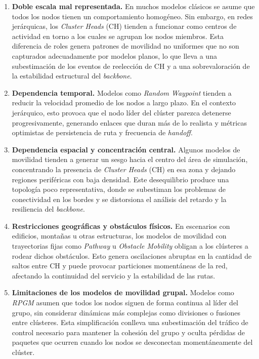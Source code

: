 \documentclass{article}
\begin{document}
\begin{enumerate}
    \item \textbf{Doble escala mal representada.} 
    En muchos modelos clásicos se asume que todos los nodos tienen un comportamiento homogéneo. Sin embargo, en redes jerárquicas, los \textit{Cluster Heads} (CH) tienden a funcionar como centros de actividad en torno a los cuales se agrupan los nodos miembros. Esta diferencia de roles genera patrones de movilidad no uniformes que no son capturados adecuadamente por modelos planos, lo que lleva a una subestimación de los eventos de reelección de CH y a una sobrevaloración de la estabilidad estructural del \textit{backbone}.

    \item \textbf{Dependencia temporal.} 
    Modelos como \textit{Random Waypoint} tienden a reducir la velocidad promedio de los nodos a largo plazo. En el contexto jerárquico, esto provoca que el nodo líder del clúster parezca detenerse progresivamente, generando enlaces que duran más de lo realista y métricas optimistas de persistencia de ruta y frecuencia de \textit{handoff}.

    \item \textbf{Dependencia espacial y concentración central.} 
    Algunos modelos de movilidad tienden a generar un sesgo hacia el centro del área de simulación, concentrando la presencia de \textit{Cluster Heads} (CH) en esa zona y dejando regiones periféricas con baja densidad. Este desequilibrio produce una topología poco representativa, donde se subestiman los problemas de conectividad en los bordes y se distorsiona el análisis del retardo y la resiliencia del \textit{backbone}.

    \item \textbf{Restricciones geográficas y obstáculos físicos.} 
    En escenarios con edificios, montañas u otras estructuras, los modelos de movilidad con trayectorias fijas como \textit{Pathway} u \textit{Obstacle Mobility} obligan a los clústeres a rodear dichos obstáculos. Esto genera oscilaciones abruptas en la cantidad de saltos entre CH y puede provocar particiones momentáneas de la red, afectando la continuidad del servicio y la estabilidad de las rutas.

    \item \textbf{Limitaciones de los modelos de movilidad grupal.} 
    Modelos como \textit{RPGM} asumen que todos los nodos siguen de forma continua al líder del grupo, sin considerar dinámicas más complejas como divisiones o fusiones entre clústeres. Esta simplificación conlleva una subestimación del tráfico de control necesario para mantener la cohesión del grupo y oculta pérdidas de paquetes que ocurren cuando los nodos se desconectan momentáneamente del clúster.


\end{enumerate}
\end{document}
